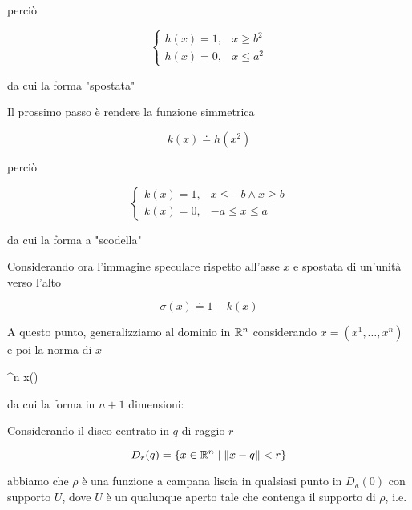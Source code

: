 perciò

\begin{equation}
	\begin{cases}
		h(x) = 1, & x \geqslant b^{2} \\
		h(x) = 0, & x \leqslant a^{2}
	\end{cases}
\end{equation}

da cui la forma "spostata"


Il prossimo passo è rendere la funzione simmetrica

\begin{equation}
	k(x) \doteq h(x^{2})
\end{equation}

perciò

\begin{equation}
	\begin{cases}
		k(x) = 1, & x \leqslant - b \wedge x \geqslant b \\
		k(x) = 0, & -a \leqslant x \leqslant a
	\end{cases}
\end{equation}

da cui la forma a "scodella"


Considerando ora l'immagine speculare rispetto all'asse $ x $ e spostata di un'unità verso l'alto

\begin{equation}
	\sigma(x) \doteq 1 - k(x)
\end{equation}


A questo punto, generalizziamo al dominio in $ \mathbb{R}^{n} $ considerando $ x = (x^{1},\dots,x^{n}) $ e poi la norma di $ x $

\map{\rho}
	{\R^{n}}{\R}
	{x}{\sigma()}

da cui la forma in $ n+1 $ dimensioni:


Considerando il disco centrato in $ q $ di raggio $ r $

\begin{equation}
	D_{r}(q) = \{ x \in \mathbb{R}^{n} \mid \norm{x - q} < r \}
\end{equation}

abbiamo che $ \rho $ è una funzione a campana liscia in qualsiasi punto in $ D_{a}(0) $ con supporto $ U $, dove $ U $ è un qualunque aperto tale che contenga il supporto di $ \rho $, i.e.

